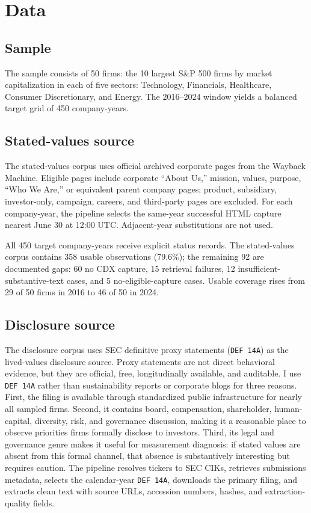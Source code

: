 \documentclass[11pt]{article}
\begin{document}
\section{Data}

\subsection{Sample}

The sample consists of 50 firms: the 10 largest S\&P 500 firms by market capitalization in each of
five sectors: Technology, Financials, Healthcare, Consumer Discretionary, and Energy. The 2016--2024
window yields a balanced target grid of 450 company-years.

\subsection{Stated-values source}

The stated-values corpus uses official archived corporate pages from the Wayback Machine. Eligible
pages include corporate ``About Us,'' mission, values, purpose, ``Who We Are,'' or equivalent parent
company pages; product, subsidiary, investor-only, campaign, careers, and third-party pages are
excluded. For each company-year, the pipeline selects the same-year successful HTML capture nearest
June 30 at 12:00 UTC. Adjacent-year substitutions are not used.

All 450 target company-years receive explicit status records. The stated-values corpus contains
358 usable observations (79.6\%); the remaining 92 are documented gaps: 60 no CDX capture, 15
retrieval failures, 12 insufficient-substantive-text cases, and 5 no-eligible-capture cases. Usable
coverage rises from 29 of 50 firms in 2016 to 46 of 50 in 2024.

\subsection{Disclosure source}

The disclosure corpus uses SEC definitive proxy statements (\texttt{DEF 14A}) as the lived-values
disclosure source. Proxy statements are not direct behavioral evidence, but they are official, free,
longitudinally available, and auditable. I use \texttt{DEF 14A} rather than sustainability reports
or corporate blogs for three reasons. First, the filing is available through standardized public
infrastructure for nearly all sampled firms. Second, it contains board, compensation, shareholder,
human-capital, diversity, risk, and governance discussion, making it a reasonable place to observe
priorities firms formally disclose to investors. Third, its legal and governance genre makes it
useful for measurement diagnosis: if stated values are absent from this formal channel, that absence
is substantively interesting but requires caution. The pipeline resolves tickers to SEC CIKs,
retrieves submissions metadata, selects the calendar-year \texttt{DEF 14A}, downloads the primary
filing, and extracts clean text with source URLs, accession numbers, hashes, and extraction-quality
fields.
\end{document}
